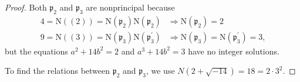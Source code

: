 \begin{proof}
    Both \(\mathfrak{p}_2\) and \(\mathfrak{p}_3\) are nonprincipal because
    \begin{align*}
        4 = \mathrm{N}((2)) = \mathrm{N}(\mathfrak{p}_2) \mathrm{N}(\mathfrak{p}_2) &\Rightarrow \mathrm{N}(\mathfrak{p}_2) = 2 \\
        9 = \mathrm{N}((3)) = \mathrm{N}(\mathfrak{p}_3) \mathrm{N}(\mathfrak{p}_3^\prime) &\Rightarrow \mathrm{N}(\mathfrak{p}_3) = \mathrm{N}(\mathfrak{p}_3^\prime) = 3 \text{,}
    \end{align*}
    but the equations \(a^2 + 14 b^2 = 2\) and \(a^3 + 14 b^2 = 3\) have no integer solutions.

    To find the relations between \(\mathfrak{p}_2\) and \(\mathfrak{p}_3\), we use \(N(2 + \sqrt{-14}) = 18 = 2 \cdot 3^2\).
\end{proof}